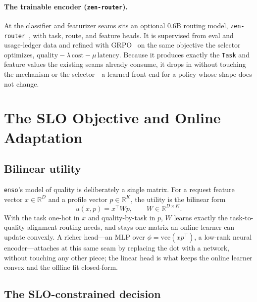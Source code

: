 \documentclass[11pt]{article}
\begin{document}
\paragraph{The trainable encoder (\texttt{zen-router}).} At the classifier and
featurizer seams sits an optional 0.6B routing model,
\texttt{zen-router}~\cite{zenrouter}, with task, route, and feature heads. It is
supervised from eval and usage-ledger data and refined with GRPO~\cite{grpo} on
the same objective the selector optimizes, $\mathrm{quality}-\lambda\,\mathrm{cost}-\mu\,\mathrm{latency}$.
Because it produces exactly the \texttt{Task} and feature values the existing
seams already consume, it drops in without touching the mechanism or the
selector---a learned front-end for a policy whose shape does not change.

\section{The SLO Objective and Online Adaptation}
\label{sec:learning}

\subsection{Bilinear utility}

\texttt{enso}'s model of quality is deliberately a single matrix. For a request
feature vector $x\in\mathbb{R}^{D}$ and a profile vector $p\in\mathbb{R}^{K}$,
the utility is the bilinear form
\begin{equation}
u(x,p) = x^{\top} W p, \qquad W\in\mathbb{R}^{D\times K}.
\end{equation}
With the task one-hot in $x$ and quality-by-task in $p$, $W$ learns exactly the
task-to-quality alignment routing needs, and stays one matrix an online learner
can update convexly. A richer head---an MLP over $\phi=\mathrm{vec}(xp^{\top})$,
a low-rank neural encoder---attaches at this same seam by replacing the dot with
a network, without touching any other piece; the linear head is what keeps the
online learner convex and the offline fit closed-form.

\subsection{The SLO-constrained decision}
\end{document}
